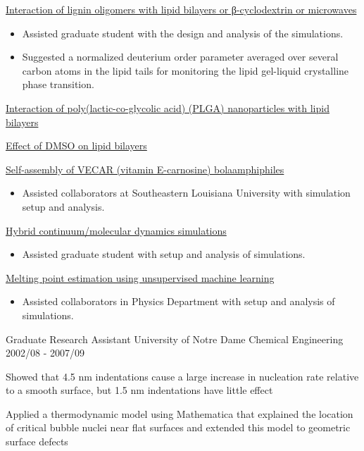 \begin{cventries}
{\begin{cvitems}
        \item {\underline{Interaction of lignin oligomers with lipid bilayers or β-cyclodextrin or microwaves}}
            \begin{itemize}
            \item {Assisted graduate student with the design and analysis of the simulations.}
            \item {Suggested a normalized deuterium order parameter averaged over several carbon atoms in the lipid tails for monitoring the lipid gel-liquid crystalline phase transition.}
            \end{itemize}            
        \item {\underline{Interaction of poly(lactic-co-glycolic acid) (PLGA) nanoparticles with lipid bilayers}}
        \item {\underline{Effect of DMSO on lipid bilayers}}
        \item {\underline{Self-assembly of VECAR (vitamin E-carnosine) bolaamphiphiles}}
            \begin{itemize}
            \item {Assisted collaborators at Southeastern Louisiana University with simulation setup and analysis.}
            \end{itemize}
        \item {\underline{Hybrid continuum/molecular dynamics simulations}}
            \begin{itemize}
            \item {Assisted graduate student with setup and analysis of simulations.}
            \end{itemize}
        \item {\underline{Melting point estimation using unsupervised machine learning}}
            \begin{itemize}
            \item {Assisted collaborators in Physics Department with setup and analysis of simulations.}
            \end{itemize}      \end{cvitems}
    }
    
  \cventry
    {Graduate Research Assistant} %
    {University of Notre Dame} %
    {Chemical Engineering} %
    {2002/08 - 2007/09} %
    {
      \begin{cvitems} %
        \item {Showed that 4.5 nm indentations cause a large increase in nucleation rate relative to a smooth surface, but 1.5 nm indentations have little effect
        \item {Applied a thermodynamic model using Mathematica that explained the location of critical bubble nuclei near flat surfaces and extended this model to geometric surface defects}
}
      \end{cvitems}
    }
    

\end{cventries}
